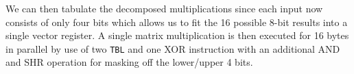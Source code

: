 We can then tabulate the decomposed multiplications since each input now
consists of only four bits which allows us to fit the 16 possible 8-bit results
into a single vector register. A single matrix multiplication is then executed
for 16 bytes in parallel by use of two \texttt{TBL} and one XOR instruction with
an additional AND and SHR operation for masking off the lower/upper 4 bits.
